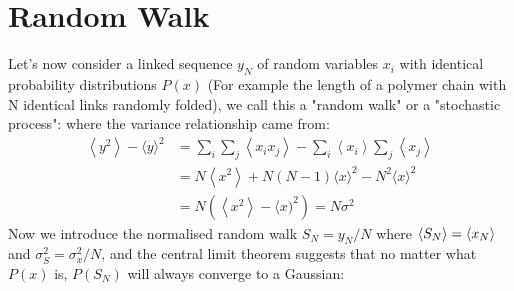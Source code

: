 \documentclass{report}
\begin{document}
\section{Random Walk} \label{section:random_walk}
Let's now consider a linked sequence $y_N$ of random variables $x_i$ with identical probability distributions $P(x)$ (For example the length of a polymer chain with N identical links randomly folded), we call this a "random walk" or a "stochastic process":
where the variance relationship came from:
\begin{align}
    \left\langle y^2\right\rangle-\langle y\rangle^2 & =\sum_i \sum_j\left\langle x_i x_j\right\rangle-\sum_i\left\langle x_i\right\rangle \sum_j\left\langle x_j\right\rangle \\
                                                     & =N\left\langle x^2\right\rangle+N(N-1)\langle x\rangle^2-N^2\langle x\rangle^2                                          \\
                                                     & =N\left(\left\langle x^2\right\rangle-\langle x)^2\right)=N \sigma^2
\end{align}
Now we introduce the normalised random walk $S_N = y_N/N$ where $\langle S_N \rangle = \langle x_N \rangle$ and $\sigma_S^2 = \sigma_x^2/N$, and the central limit theorem suggests that no matter what $P(x)$ is, $P(S_N)$ will always converge to a Gaussian:
\end{document}
